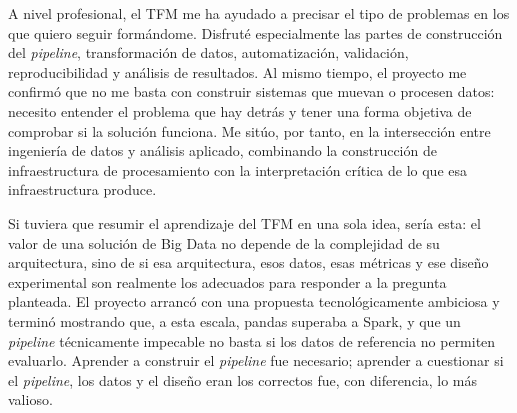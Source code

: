 A nivel profesional, el TFM me ha ayudado a precisar el tipo de problemas en los que quiero seguir formándome. Disfruté especialmente las partes de construcción del \textit{pipeline}, transformación de datos, automatización, validación, reproducibilidad y análisis de resultados. Al mismo tiempo, el proyecto me confirmó que no me basta con construir sistemas que muevan o procesen datos: necesito entender el problema que hay detrás y tener una forma objetiva de comprobar si la solución funciona. Me sitúo, por tanto, en la intersección entre ingeniería de datos y análisis aplicado, combinando la construcción de infraestructura de procesamiento con la interpretación crítica de lo que esa infraestructura produce.

Si tuviera que resumir el aprendizaje del TFM en una sola idea, sería esta: el valor de una solución de Big Data no depende de la complejidad de su arquitectura, sino de si esa arquitectura, esos datos, esas métricas y ese diseño experimental son realmente los adecuados para responder a la pregunta planteada. El proyecto arrancó con una propuesta tecnológicamente ambiciosa y terminó mostrando que, a esta escala, pandas superaba a Spark, y que un \textit{pipeline} técnicamente impecable no basta si los datos de referencia no permiten evaluarlo. Aprender a construir el \textit{pipeline} fue necesario; aprender a cuestionar si el \textit{pipeline}, los datos y el diseño eran los correctos fue, con diferencia, lo más valioso.
